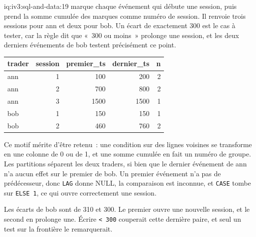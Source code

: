 \begin{solution}{iq:iv3:sql-and-data:19}
 marque chaque événement qui débute une session, puis prend la somme cumulée des marques comme numéro de session. Il renvoie trois sessions pour ann et deux pour bob. Un écart de exactement 300 est le cas à tester, car la règle dit que «~300 ou moins~» prolonge une session, et les deux derniers événements de bob testent précisément ce point.
\label{lst:iv3:sq:sessions}
\begin{center}\small
\begin{tabular}{lrrrr}
trader & session & premier\_ts & dernier\_ts & n\\\hline
ann & 1 & 100 & 200 & 2\\
ann & 2 & 700 & 800 & 2\\
ann & 3 & 1500 & 1500 & 1\\
bob & 1 & 150 & 150 & 1\\
bob & 2 & 460 & 760 & 2
\end{tabular}
\end{center}
Ce motif mérite d'être retenu~: une condition sur des lignes voisines se transforme en une colonne de 0 ou de 1, et une somme cumulée en fait un numéro de groupe. Les partitions séparent les deux traders, si bien que le dernier événement de ann n'a aucun effet sur le premier de bob. Un premier événement n'a pas de prédécesseur, donc \texttt{LAG} donne NULL, la comparaison est inconnue, et \texttt{CASE} tombe sur \texttt{ELSE 1}, ce qui ouvre correctement une session.

Les écarts de bob sont de 310 et 300. Le premier ouvre une nouvelle session, et le second en prolonge une. Écrire \texttt{< 300} couperait cette dernière paire, et seul un test sur la frontière le remarquerait.

\end{solution}

